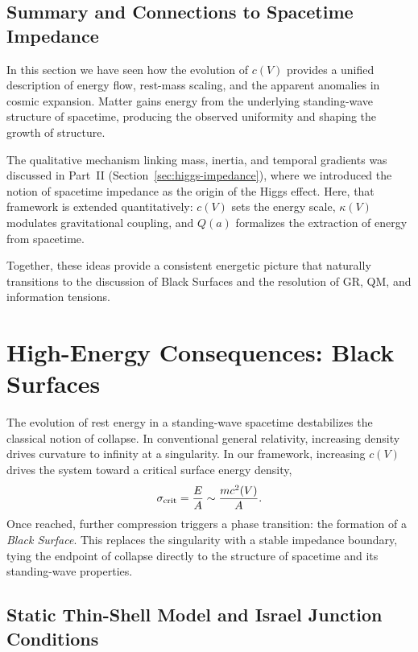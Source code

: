\documentclass[12pt]{article}
\begin{document}
\subsection{Summary and Connections to Spacetime Impedance}

In this section we have seen how the evolution of $c(V)$ provides a unified description of energy flow, rest-mass scaling, and the apparent anomalies in cosmic expansion. Matter gains energy from the underlying standing-wave structure of spacetime, producing the observed uniformity and shaping the growth of structure. 

The qualitative mechanism linking mass, inertia, and temporal gradients was discussed in Part~II (Section~\ref{sec:higgs-impedance}), where we introduced the notion of spacetime impedance as the origin of the Higgs effect. Here, that framework is extended quantitatively: $c(V)$ sets the energy scale, $\kappa(V)$ modulates gravitational coupling, and $Q(a)$ formalizes the extraction of energy from spacetime.

Together, these ideas provide a consistent energetic picture that naturally transitions to the discussion of Black Surfaces and the resolution of GR, QM, and information tensions.


\section{High-Energy Consequences: Black Surfaces}

The evolution of rest energy in a standing-wave spacetime destabilizes the classical notion of collapse. In conventional general relativity, increasing density drives curvature to infinity at a singularity. In our framework, increasing \(c(V)\) drives the system toward a critical surface energy density,
\begin{equation}
\sigma_{\rm crit} = \frac{E}{A} \sim \frac{m c^2(V)}{A}.
\end{equation}
Once reached, further compression triggers a phase transition: the formation of a \emph{Black Surface}. This replaces the singularity with a stable impedance boundary, tying the endpoint of collapse directly to the structure of spacetime and its standing-wave properties.

\subsection{Static Thin-Shell Model and Israel Junction Conditions}
\end{document}
